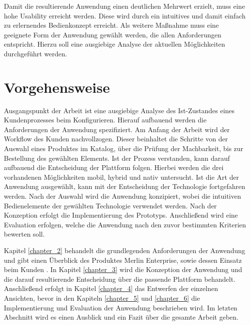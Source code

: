 Damit die resultierende Anwendung einen deutlichen Mehrwert erzielt, muss eine hohe Usability erreicht werden. Diese wird durch ein intuitives und damit einfach zu erlernendes Bedienkonzept erreicht. Als weitere Maßnahme muss eine geeignete Form der Anwendung gewählt werden, die allen Anforderungen entspricht. Hierzu soll eine ausgiebige Analyse der aktuellen Möglichkeiten durchgeführt werden.



\section{Vorgehensweise}
Ausgangspunkt der Arbeit ist eine ausgiebige Analyse des Ist-Zustandes eines Kundenprozesses beim Konfigurieren. Hierauf aufbauend werden die Anforderungen der Anwendung spezifiziert. 
Am Anfang der Arbeit wird der Workflow des Kunden nachvollzogen. Dieser beinhaltet die Schritte von der Auswahl eines Produktes im Katalog, über die Prüfung der Machbarkeit, bis zur Bestellung des gewählten Elements. Ist der Prozess verstanden, kann darauf aufbauend die Entscheidung der Plattform folgen. Hierbei werden die drei vorhandenen Möglichkeiten mobil, hybrid und nativ untersucht. Ist die Art der Anwendung ausgewählt, kann mit der Entscheidung der Technologie fortgefahren werden. Nach der Auswahl wird die Anwendung konzipiert, wobei die intuitiven Bedienelemente der gewählten Technologie verwendet werden. Nach der Konzeption erfolgt die Implementierung des Prototyps. Anschließend wird eine Evaluation erfolgen, welche die Anwendung nach den zuvor bestimmten Kriterien bewerten soll.

\par
Kapitel \ref{chapter_2} behandelt die grundlegenden Anforderungen der Anwendung und gibt einen Überblick des Produktes Merlin Enterprise, sowie dessen Einsatz beim Kunden . In Kapitel \ref{chapter_3} wird die Konzeption der Anwendung und die darauf resultierende Entscheidung über die passende Plattform behandelt. Anschließend erfolgt in Kapitel \ref{chapter_4} das Entwerfen der einzelnen Ansichten, bevor in den Kapiteln \ref{chapter_5} und \ref{chapter_6} die Implementierung und Evaluation der Anwendung beschrieben wird. Im letzten Abschnitt wird es einen Ausblick und ein Fazit über die gesamte Arbeit geben.



